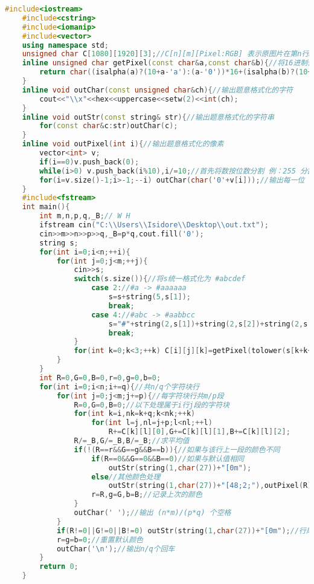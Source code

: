 \begin{lstlisting}[language=C++]
    #include<iostream>
    #include<cstring>
    #include<iomanip>
    #include<vector>
    using namespace std;
    unsigned char C[1080][1920][3];//C[n][m][Pixel:RGB] 表示原图片在第n行m列的像素颜色 
    inline unsigned char getPixel(const char&a,const char&b){//将16进制像素数转换为10进制的char 
        return char((isalpha(a)?(10+a-'a'):(a-'0'))*16+(isalpha(b)?(10+b-'a'):(b-'0')));
    }
    inline void outChar(const unsigned char&ch){//输出题意格式化的字符 
        cout<<"\\x"<<hex<<uppercase<<setw(2)<<int(ch);
    }
    inline void outStr(const string& str){//输出题意格式化的字符串 
        for(const char&c:str)outChar(c);
    }
    inline void outPixel(int i){//输出题意格式化的像素 
        vector<int> v;
        if(i==0)v.push_back(0);
        while(i>0) v.push_back(i%10),i/=10;//首先将数按位数分割 例：255 分割为 2、5、5三个数 
        for(i=v.size()-1;i>-1;--i) outChar(char('0'+v[i]));//输出每一位 
    }
    #include<fstream> 
    int main(){
        int m,n,p,q,_B;// W H 
        ifstream cin("C:\\Users\\Isidore\\Desktop\\out.txt");
        cin>>m>>n>>p>>q,_B=p*q,cout.fill('0');
        string s;
        for(int i=0;i<n;++i){
            for(int j=0;j<m;++j){
                cin>>s;
                switch(s.size()){//将s统一格式化为 #abcdef 
                    case 2://#a -> #aaaaaa 
                        s=s+string(5,s[1]);
                        break;
                    case 4://#abc -> #aabbcc
                        s="#"+string(2,s[1])+string(2,s[2])+string(2,s[3]);
                        break;
                }
                for(int k=0;k<3;++k) C[i][j][k]=getPixel(tolower(s[k+k+1]),tolower(s[k+k+2]));
            }
        }
        int R=0,G=0,B=0,r=0,g=0,b=0;
        for(int i=0;i<n;i+=q){//共n/q个字符块行 
            for(int j=0;j<m;j+=p){//每字符块行共m/p段 
                R=0,G=0,B=0;//以下处理属于i行j段的字符块
                for(int k=i,nk=k+q;k<nk;++k)
                    for(int l=j,nl=j+p;l<nl;++l)
                        R+=C[k][l][0],G+=C[k][l][1],B+=C[k][l][2];
                R/=_B,G/=_B,B/=_B;//求平均值 
                if(!(R==r&&G==g&&B==b)){//如果与该行上一段的颜色不同 
                    if(R==0&&G==0&&B==0)//如果与默认值相同 
                        outStr(string(1,char(27))+"[0m");
                    else//其他颜色处理 
                        outStr(string(1,char(27))+"[48;2;"),outPixel(R),outChar(';'),outPixel(G),outChar(';'),outPixel(B),outChar('m');
                    r=R,g=G,b=B;//记录上次的颜色 
                }
                outChar(' ');//输出 (n*m)/(p*q) 个空格 
            }
            if(R!=0||G!=0||B!=0) outStr(string(1,char(27))+"[0m");//行尾判断是否需要重置颜色 
            r=g=b=0;//重置默认颜色 
            outChar('\n');//输出n/q个回车 
        }
        return 0;
    }    
\end{lstlisting}